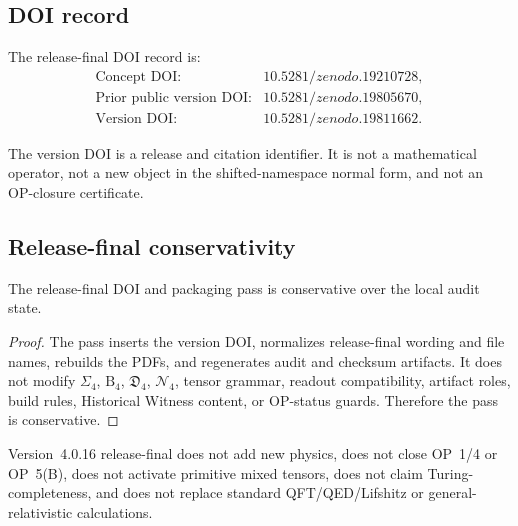 \subsection{DOI record}
\label{subsec:v4016-release-final-doi-record}

\begin{definition}
\label{def:v4016-release-final-doi-record}
The release-final DOI record is:
\[
\begin{array}{ll}
\text{Concept DOI:} & 10.5281/zenodo.19210728,\\
\text{Prior public version DOI:} & 10.5281/zenodo.19805670,\\
\text{Version DOI:} & 10.5281/zenodo.19811662.
\end{array}
\]
\end{definition}

\begin{remark}
\label{rem:v4016-version-doi-is-metadata}
The version DOI is a release and citation identifier. It is not a mathematical
operator, not a new object in the shifted-namespace normal form, and not an OP-closure
certificate.
\end{remark}

\subsection{Release-final conservativity}
\label{subsec:v4016-release-final-doi-pass-conservativity}

\begin{theorem}
\label{thm:v4016-release-final-doi-pass-conservativity}
The  release-final DOI and packaging pass is conservative over the
 local audit state.
\end{theorem}

\begin{proof}
The pass inserts the version DOI, normalizes release-final wording and file
names, rebuilds the PDFs, and regenerates audit and checksum artifacts. It does
not modify $\Sigma_4$, $\mathrm B_4$, $\mathfrak D_4$, $\mathcal N_4$, tensor
grammar, readout compatibility, artifact roles, build rules, Historical Witness
content, or OP-status guards. Therefore the pass is conservative.
\end{proof}

\begin{remark}
\label{rem:v4016-release-final-non-claim}
Version~4.0.16 release-final does not add new physics, does not close OP~1/4
or OP~5(B), does not activate primitive mixed tensors, does not claim
Turing-completeness, and does not replace standard QFT/QED/Lifshitz or
general-relativistic calculations.
\end{remark}



\clearpage
